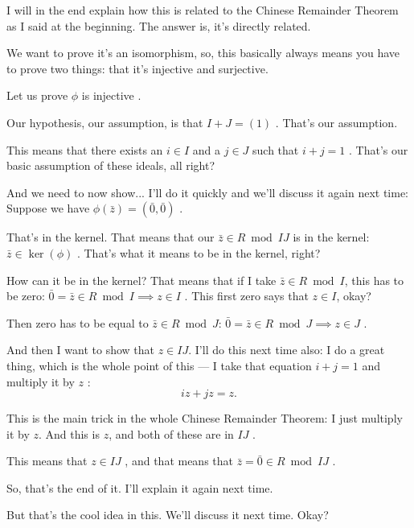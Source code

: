 \begin{speech}[01:27:55 - 01:29:47]
I will in the end explain how this is related to the Chinese Remainder Theorem as I said at the beginning. The answer is, it's directly related.

We want to prove it's an isomorphism, so, this basically always means you have to prove two things: that it's injective and surjective.

Let us prove $\phi$ is injective .

Our hypothesis, our assumption, is that $I + J = (1)$ . That's our assumption.

This means that there exists an $i \in I$ and a $j \in J$ such that $i + j = 1$ . That's our basic assumption of these ideals, all right?

And we need to now show... I'll do it quickly and we'll discuss it again next time: Suppose we have $\phi(\bar{z}) = (\bar{0}, \bar{0})$ .

That's in the kernel. That means that our $\bar{z} \in R \bmod IJ$ is in the kernel: $\bar{z} \in \ker(\phi)$ . That's what it means to be in the kernel, right?
\end{speech}

\begin{speech}[01:29:47 - 01:31:12]
How can it be in the kernel? That means that if I take $\bar{z} \in R \bmod I$, this has to be zero: $\bar{0} = \bar{z} \in R \bmod I \implies z \in I$ . This first zero says that $z \in I$, okay?

Then zero has to be equal to $\bar{z} \in R \bmod J$: $\bar{0} = \bar{z} \in R \bmod J \implies z \in J$ .

And then I want to show that $z \in IJ$. I'll do this next time also: I do a great thing, which is the whole point of this --- I take that equation $i + j = 1$ and multiply it by $z$ :
\[
iz + jz = z.
\]

This is the main trick in the whole Chinese Remainder Theorem: I just multiply it by $z$. And this is $z$, and both of these are in $IJ$ .

This means that $z \in IJ$ , and that means that $\bar{z} = \bar{0} \in R \bmod IJ$ .

So, that's the end of it. I'll explain it again next time.

But that's the cool idea in this. We'll discuss it next time. Okay? 
\end{speech}

